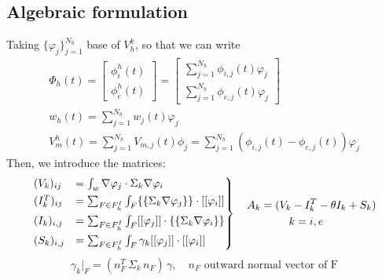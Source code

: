 \documentclass[a4paper,11pt]{article}
\begin{document}
    \subsection{Algebraic formulation}
    Taking $\{\varphi_j\}_{j=1}^{N_h}$ base of $V_h^k$, so that we can write
    \begin{equation*}
    \begin{gathered}
    \Phi_h(t) = \begin{bmatrix} \phi_i^h(t) \\ \phi_e^h(t) \end{bmatrix} = \begin {bmatrix}\sum_{j=1}^{N_h} \phi_{i,j}(t)\varphi_j \\ \sum_{j=1}^{N_h} \phi_{e,j}(t)\varphi_j \end{bmatrix}\\
    w_h(t) = \sum_{j=1}^{N_h}w_j(t)\varphi_j\\
    V_m^h(t)=\sum_{j=1}^{N_h} V_{m,j}(t) \phi_j=\sum_{j=1}^{N_h}(\phi_{i,j}(t)-\phi_{e,j}(t))\varphi_j
 \end{gathered}
 \end{equation*}
 Then, we introduce the matrices:
 \begin{equation}\label{matrices}
\begin{rcases}
(V_k)_{ij} &= \int_{w}\nabla\varphi_j \cdot \Sigma_k \nabla \varphi_i 
\\ (I_k^T)_{ij} &= \sum_{F \in F_h^I} \int_{F} \{\{\Sigma_k \nabla\varphi_j\}\} \cdot [[\varphi_i]] 
\\ (I_k)_{i,j} &= \sum_{F \in F_h^I} \int_{F} [[\varphi_j]] \cdot \{\{\Sigma_k \nabla \varphi_i\}\}
\\(S_k)_{i,j} &= \sum_{F \in F_h^I} \int_{F} \gamma_k[[\varphi_j]] \cdot [[\varphi_i]]
\end{rcases}
\begin{gathered}
\quad A_k = (V_k -I_k^T - \theta I_k + S_k)\\
k=i,e \\
\end{gathered}
\end{equation}
\begin{equation*}
\gamma_k\vert_F = (n_F^T \, \Sigma_k \, n_F) \,\gamma, \quad n_F \text{ outward normal vector of F}
\end{equation*}
\end{document}

